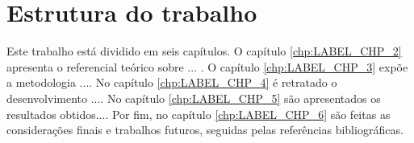 \section{Estrutura do trabalho}

Este trabalho está dividido em seis capítulos. O capítulo \ref{chp:LABEL_CHP_2} apresenta o referencial teórico sobre ... . O capítulo \ref{chp:LABEL_CHP_3} expõe a metodologia ....
No capítulo \ref{chp:LABEL_CHP_4} é retratado o desenvolvimento .... No capítulo \ref{chp:LABEL_CHP_5} são apresentados os resultados obtidos.... Por fim, no capítulo \ref{chp:LABEL_CHP_6} são feitas as
considerações finais e trabalhos futuros, seguidas pelas referências bibliográficas.